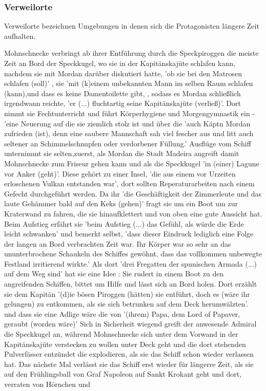 {\subsubsection{Verweilorte}
Verweilorte bezeichnen Umgebungen in denen sich die Protagonisten längere Zeit aufhalten.

Mohnschnecke verbringt ab ihrer Entführung durch die Speckpiroggen \cite[S.32]{pir} die meiste Zeit an Bord der Speckkugel, wo sie in der Kapitänskajüte schlafen kann, nachdem sie mit Mordan darüber diskutiert hatte, 'ob sie bei den Matrosen schlafen (soll)' \cite[S.78]{pir}, sie 'mit (k)einem unbekannten Mann im selben Raum schlafen (kann),\cite[S.78]{pir}und dass es keine Damentoilette gibt, \cite[S.78]{pir}, sodass es Mordan schließlich irgendwann reichte, \cite[S.78]{pir} 'er (...) fluchtartig seine Kapitänskajüte (verließ)'.\cite[S.78]{pir} Dort nimmt sie Fechtunterricht \cite[S.127f]{pir} und führt Körperhygiene und Morgengymnastik ein - 'eine Neuerung auf die sie ziemlich stolz ist \cite[S.181]{pir} und über die 'auch Käptn Mordan zufrieden (ist), denn eine saubere Mannschaft sah viel fescher aus und litt auch seltener an Schimmelschnupfen oder verdorbener Füllung.'\cite[S.181]{pir} Ausflüge vom Schiff unternimmt sie selten,zuerst, als Mordan die Stadt Madeira angreift \cite[S.186ff]{pir} damit Mohnschnecke zum Friseur gehen kann \cite[S.195]{pir} und als die Speckkugel 'in (einer) Lagune vor Anker (geht)'.\cite[S.247]{pir} Diese gehört zu einer Insel, 'die aus einem vor Urzeiten erloschenen Vulkan entstanden war',\cite[S.246]{pir} dort sollten Reperaturarbeiten nach einem Gefecht durchgeführt werden.\cite[S.245f]{pir} Da ihr 'die Geschäftigkeit der Zimmerleute und das laute Gehämmer bald auf den Keks (gehen)'\cite[S.247]{pir} fragt sie um ein Boot um zur Kraterwand zu fahren, die sie hinaufklettert und von oben eine gute Aussicht hat. \cite[S.247f]{pir} Beim Aufstieg erfährt sie 'beim Aufstieg (...) das Gefühl, als würde die Erde leicht schwanken'\cite[S.248]{pir} und bemerkt selbst, 'dass dieser Eindruck lediglich eine Folge der langen an Bord verbrachten Zeit war. Ihr Körper war so sehr an das ununterbrochene Schaukeln des Schiffes gewöhnt, dass das vollkommen unbewegte Festland irritierend wirkte.'\cite[S.248]{pir} Als dort 'drei Fregatten der spunischen Armada (...) auf dem Weg sind'\cite[S.250]{pir} hat sie eine Idee \cite[S.251]{pir}: Sie rudert in einem Boot zu den angreifenden Schiffen, bittet um Hilfe und lässt sich an Bord holen. Dort erzählt sie dem Kapitän '(d)ie bösen Piroggen (hätten) sie entführt, doch es (wäre ihr gelungen) zu entkommen, als sie sich betrunken auf dem Deck herumwälzten'.\cite[S.254]{pir} und dass sie eine Adlige wäre die von '(ihrem) Papa, dem Lord of Papaver, geraubt (worden wäre)'\cite[S.255]{pir} Sich in Sicherheit wiegend greift der anwesende Admiral die Speckkugel an, während Mohnschnecke sich unter dem Vorwand in der Kapitänskajüte verstecken zu wollen unter Deck geht und die dort stehenden Pulverfässer entzündet die explodieren, als sie das Schiff schon wieder verlassen hat. \cite[S.257ff]{pir} Das nächste Mal verlässt sie das Schiff erst wieder für längerre Zeit, als sie auf den Frühlingsball von Graf Napoleon auf Sankt Krokant geht\cite[S.542]{pir} und dort, verraten von Hörnchen und }
